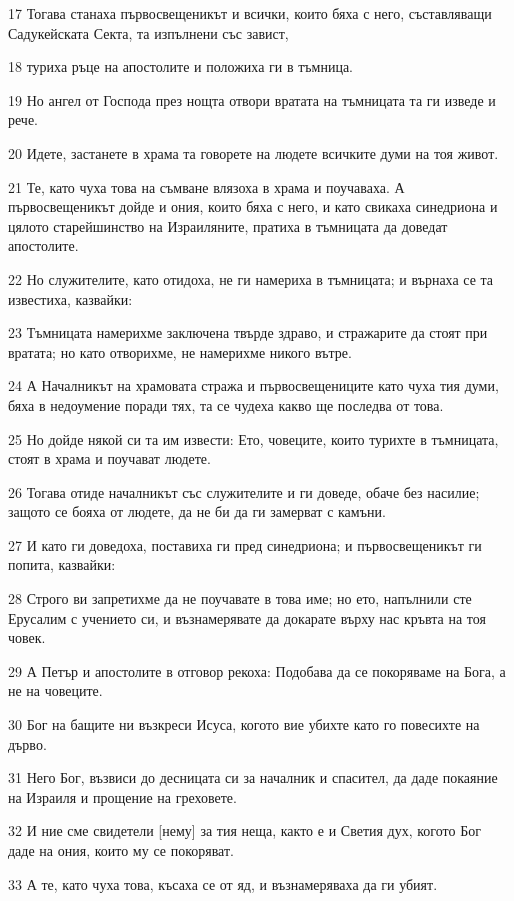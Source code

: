 \par 17 Тогава станаха първосвещеникът и всички, които бяха с него, съставляващи Садукейската Секта, та изпълнени със завист,
\par 18 туриха ръце на апостолите и положиха ги в тъмница.
\par 19 Но ангел от Господа през нощта отвори вратата на тъмницата та ги изведе и рече.
\par 20 Идете, застанете в храма та говорете на людете всичките думи на тоя живот.
\par 21 Те, като чуха това на съмване влязоха в храма и поучаваха. А първосвещеникът дойде и ония, които бяха с него, и като свикаха синедриона и цялото старейшинство на Израиляните, пратиха в тъмницата да доведат апостолите.
\par 22 Но служителите, като отидоха, не ги намериха в тъмницата; и върнаха се та известиха, казвайки:
\par 23 Тъмницата намерихме заключена твърде здраво, и стражарите да стоят при вратата; но като отворихме, не намерихме никого вътре.
\par 24 А Началникът на храмовата стража и първосвещениците като чуха тия думи, бяха в недоумение поради тях, та се чудеха какво ще последва от това.
\par 25 Но дойде някой си та им извести: Ето, човеците, които турихте в тъмницата, стоят в храма и поучават людете.
\par 26 Тогава отиде началникът със служителите и ги доведе, обаче без насилие; защото се бояха от людете, да не би да ги замерват с камъни.
\par 27 И като ги доведоха, поставиха ги пред синедриона; и първосвещеникът ги попита, казвайки:
\par 28 Строго ви запретихме да не поучавате в това име; но ето, напълнили сте Ерусалим с учението си, и възнамерявате да докарате върху нас кръвта на тоя човек.
\par 29 А Петър и апостолите в отговор рекоха: Подобава да се покоряваме на Бога, а не на човеците.
\par 30 Бог на бащите ни възкреси Исуса, когото вие убихте като го повесихте на дърво.
\par 31 Него Бог, възвиси до десницата си за началник и спасител, да даде покаяние на Израиля и прощение на греховете.
\par 32 И ние сме свидетели [нему] за тия неща, както е и Светия дух, когото Бог даде на ония, които му се покоряват.
\par 33 А те, като чуха това, късаха се от яд, и възнамеряваха да ги убият.
